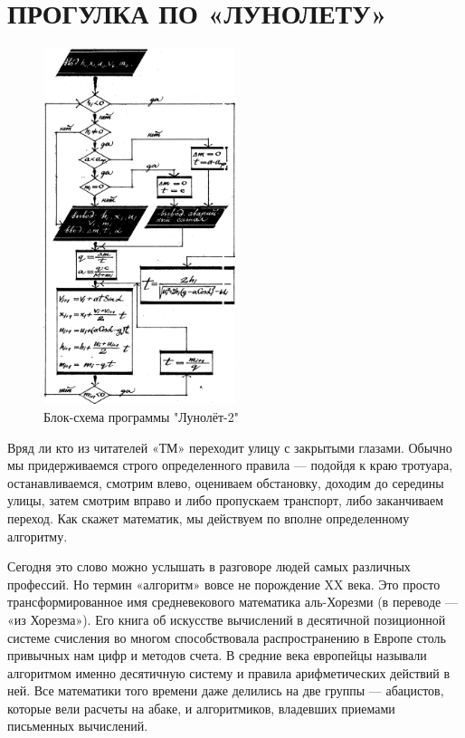 \documentclass[11pt,a4paper,oneside]{article}
\begin{document}
\section{ПРОГУЛКА ПО «ЛУНОЛЕТУ»}
\begin{figure}[H]
\includegraphics[width=0.5\textwidth]{lunolet2_algo}
\caption{Блок-схема программы "Лунолёт-2"}
\end{figure}

Вряд ли кто из читателей «ТМ» переходит улицу с закрытыми глазами. Обычно мы придерживаемся строго определенного правила — подойдя к краю тротуара, останавливаемся, смотрим влево, оцениваем обстановку, доходим до середины улицы, затем смотрим вправо и либо пропускаем транспорт, либо заканчиваем переход. Как скажет математик, мы действуем по вполне определенному алгоритму.

Сегодня это слово можно услышать в разговоре людей самых различных профессий. Но термин «алгоритм» вовсе не порождение XX века. Это просто трансформированное имя средневекового математика аль-Хорезми (в переводе — «из Хорезма»). Его книга об искусстве вычислений в десятичной позиционной системе счисления во многом способствовала распространению в Европе столь привычных нам цифр и методов счета. В средние века европейцы называли алгоритмом именно десятичную систему и правила арифметических действий в ней. Все математики того времени даже делились на две группы — абацистов, которые вели расчеты на абаке, и алгоритмиков, владевших приемами письменных вычислений.
\end{document}
